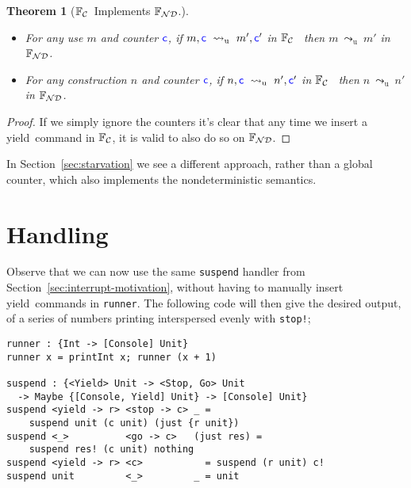 \documentclass[msc,deptreport,cs]{infthesis} %
\newtheorem{theorem}{Theorem}
\newcommand{\code}[1]{\lstinline{#1}}
\newcommand\nondetfrank{$\mathbb{F}_{\cal{ND}}$}
\newcommand\countingfrank{$\mathbb{F}_{\cal{C}}$}
\newcommand{\counter}{{\color{blue} \textsf{c}}}
\newcommand\yield{\textsf{yield}\xspace}
\newcommand{\redtou}{\leadsto_{\mathrm{u}}}
\begin{document}
\begin{theorem}[\countingfrank~Implements \nondetfrank.]~
\begin{itemize}
\item For any use $m$ and counter $\counter$, if $m, \counter~\redtou~
  m',\counter'$ in \countingfrank~ then $m~\redtou~m'$ in \nondetfrank.
\item For any construction $n$ and counter $\counter$, if $n, \counter~\redtou~
  n',\counter'$ in \countingfrank~ then $n~\redtou~n'$ in \nondetfrank.
\end{itemize}
\end{theorem}
\begin{proof}
  If we simply ignore the counters it's clear that any time we insert a \yield~command in \countingfrank, it is valid to also do so on \nondetfrank.
  \end{proof}


In Section~\ref{sec:starvation} we see a different approach, rather than a
global counter, which also implements the nondeterministic semantics.

\section{Handling}
\label{sec:handling}

Observe that we can now use the same \code{suspend} handler from
Section~\ref{sec:interrupt-motivation}, without having to manually insert
\yield~commands in \code{runner}. The following code will then give the desired
output, of a series of numbers printing interspersed evenly with \code{stop!};

\begin{lstlisting}
runner : {Int -> [Console] Unit}
runner x = printInt x; runner (x + 1)

suspend : {<Yield> Unit -> <Stop, Go> Unit
  -> Maybe {[Console, Yield] Unit} -> [Console] Unit}
suspend <yield -> r> <stop -> c> _ =
    suspend unit (c unit) (just {r unit})
suspend <_>          <go -> c>   (just res) =
    suspend res! (c unit) nothing
suspend <yield -> r> <c>           = suspend (r unit) c!
suspend unit         <_>         _ = unit
\end{lstlisting}
\end{document}

